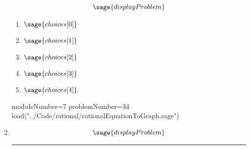 \documentclass[14pt]{article}
\newcommand{\litem}[1]{\item#1\hspace*{-1cm}\rule{\textwidth}{0.4pt}}
\begin{document}
\begin{enumerate}
{\[ \sage{displayProblem} \]

	\begin{enumerate}[label=\Alph*.]
		\item \( \sage{choices[0]} \)
		\item \( \sage{choices[1]} \)
		\item \( \sage{choices[2]} \)
		\item \( \sage{choices[3]} \)
		\item \( \sage{choices[4]} \)
	\end{enumerate}
}

\begin{sagesilent}
moduleNumber=7
problemNumber=34
load("../Code/rational/rationalEquationToGraph.sage")
\end{sagesilent}

\litem{ 
\[ \sage{displayProblem} \]

}
\end{enumerate}
\end{document}
